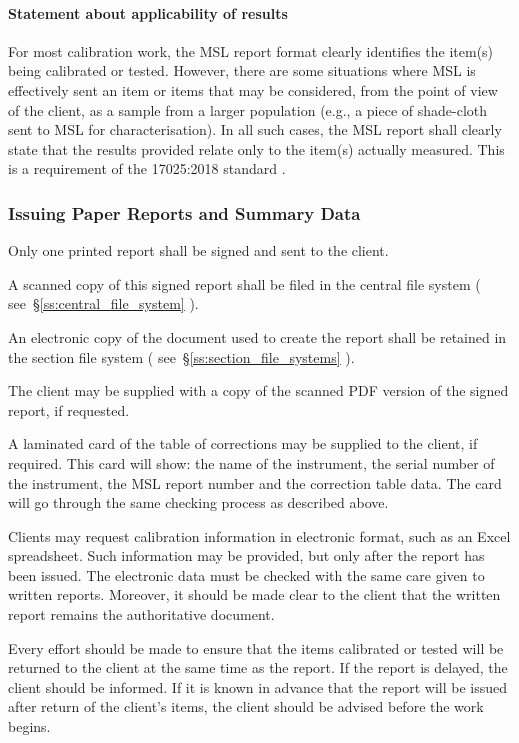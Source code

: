 \paragraph{Statement about applicability of results}
For most calibration work, the MSL report format clearly identifies the item(s) being calibrated or tested. However, there are some situations where MSL is effectively sent an item or items that may be considered, from the point of view of the client, as a sample from a larger population (e.g., a piece of shade-cloth sent to MSL for characterisation). In all such cases, the MSL report shall clearly state that the results provided relate only to the item(s) actually measured. This is a requirement of the 17025:2018 standard \cite[clause 7.8.2.1~(l)]{ISO_17025}.      

\subsubsection{Issuing Paper Reports and Summary Data}

Only one printed report shall be signed and sent to the client. 

A scanned copy of this signed report shall be filed in the central file system ( see~\S\ref{ss:central_file_system} ). 

An electronic copy of the document used to create the report shall be retained in the section file system ( see~\S\ref{ss:section_file_systems} ). 
   
The client may be supplied with a copy of the scanned PDF version of the signed report, if requested.

A laminated card of the table of corrections may be supplied to the client, if required.  This card will show: the name of the instrument, the serial number of the instrument, the MSL report number and the correction table data.  The card will go through the same checking process as described above.

Clients may request calibration information in electronic format, such as an Excel spreadsheet. Such information may be provided, but only after the report has been issued. The electronic data must be checked with the same care given to written reports. Moreover, it should be made clear to the client that the written report remains the authoritative document. 

Every effort should be made to ensure that the items calibrated or tested will be returned to the client at the same time as the report. If the report is delayed, the client should be informed. If it is known in advance that the report will be issued after return of the client's items, the client should be advised before the work begins.


